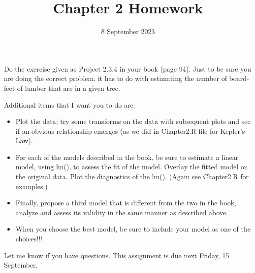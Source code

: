 \documentclass{article}
\title{Chapter 2 Homework}
\date{8 September 2023}
\begin{document}
\maketitle

Do the exercise given as Project 2.3.4 in your book (page 94). Just to be sure you are doing the correct problem, it has to do with estimating the number of board-feet of lumber that are in a given tree. 

Additional items that I want you to do are:

\begin{itemize}
    \item Plot the data; try some transforms on the data with subsequent plots and see if an obvious relationship emerges (as we did in Chapter2.R file for Kepler's Law).
    \item For each of the models described in the book, be sure to estimate a linear model, using lm(), to assess the fit of the model. Overlay the fitted model on the original data. Plot the diagnostics of the lm(). (Again see Chapter2.R for examples.)
    \item Finally, propose a third model that is different from the two in the book, analyze and assess its validity in the same manner as described above.
    \item When you choose the best model, be sure to include your model as one of the choices!!!
\end{itemize}

Let me know if you have questions. This assignment is due next Friday, 15 September. 
\end{document}
